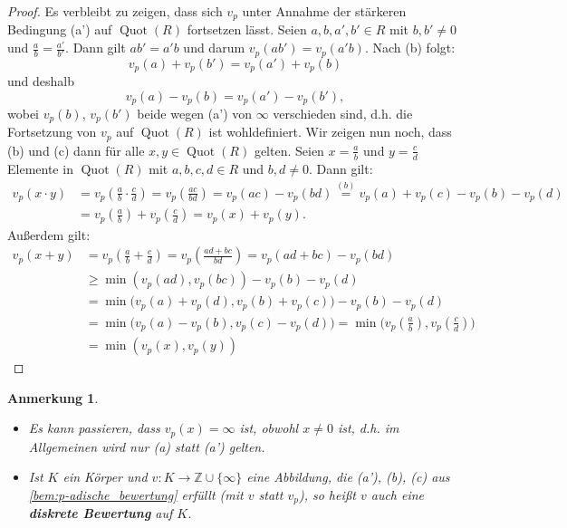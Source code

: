 \documentclass[a4paper, twoside, 11pt, ngerman]{report}
\newcommand{\ZZ}{\mathds Z}
\DeclareMathOperator{\Quot}{Quot}
\theoremstyle{definistyle}
\newtheorem{anm}[satz]{Anmerkung}
\theoremstyle{remark}
\newcommand{\defn}[1]{\textit{\bfseries #1}}
\begin{document}
\begin{proof}
Es verbleibt zu zeigen, dass sich $v_p$ unter Annahme der stärkeren Bedingung (a') auf $\Quot(R)$
fortsetzen lässt. Seien $a, b, a', b' \in R$ mit $b, b' \neq 0$ und $\frac{a}{b} = \frac{a'}{b'}$. Dann gilt $a b' = a' b$ und darum $v_p(a b') = v_p(a' b)$.
Nach (b) folgt:
\[
v_p(a) + v_p(b') = v_p(a') + v_p(b)
\]
und deshalb
\[
v_p(a) - v_p(b) = v_p(a') - v_p(b'),
\]
wobei $v_p(b)$, $v_p(b')$ beide wegen (a') von $\infty$ verschieden sind, d.h. die Fortsetzung von $v_p$ auf $\Quot(R)$ ist wohldefiniert. Wir zeigen nun noch, dass (b) und (c) dann für alle $x,y\in\Quot(R)$ gelten. Seien $x = \frac{a}{b}$ und $y = \frac{c}{d}$ Elemente in $\Quot(R)$ mit $a, b, c, d \in R$ und $b, d \neq 0$. Dann gilt:
\begin{align*}
v_p(x \cdot y) &= v_p\left(\frac{a}{b} \cdot \frac{c}{d}\right) = v_p\left(\frac{a c}{b d}\right)
=v_p(ac)-v_p(bd)\overset{(b)}{=}
v_p(a) + v_p(c) - v_p(b) - v_p(d)\\
&= v_p\left(\frac{a}{b}\right) + v_p\left(\frac{c}{d}\right) = v_p(x) + v_p(y).
\end{align*}
Außerdem gilt:
\begin{align*}
v_p(x + y) &= v_p\left(\frac{a}{b} + \frac{c}{d}\right) = v_p\left(\frac{a d + b c}{b d}\right)
= v_p(a d + b c) - v_p(b d)\\
& \geq \min(v_p(a d), v_p(b c)) - v_p(b) - v_p(d)\\
& = \min\big(v_p(a) + v_p(d), v_p(b) + v_p(c)\big) - v_p(b) - v_p(d)\\
& = \min\big(v_p(a) - v_p(b), v_p(c) - v_p(d)\big) = \min\big(v_p\left(\frac{a}{b}\right),v_p\left(\frac{c}{d}\right)\big)\\
& = \min(v_p(x), v_p(y))
\end{align*}
\end{proof}

\begin{anm}\label{anm:diskrete_bewertung}
\begin{itemize}
\item Es kann passieren, dass $v_p(x) = \infty$ ist, obwohl $x \neq 0$ ist, d.h. im Allgemeinen wird nur (a) statt (a') gelten.
\item Ist $K$ ein Körper und $v \colon K \to \ZZ \cup \{\infty\}$ eine Abbildung, die (a'), (b), (c) aus \ref{bem:p-adische_bewertung} erfüllt (mit $v$ statt $v_p$), so heißt $v$ auch eine \defn{diskrete Bewertung} auf $K$.
\end{itemize}
\end{anm}
\end{document}
